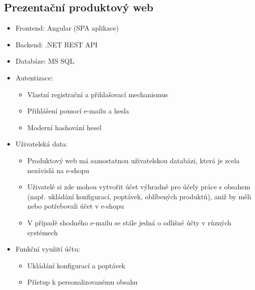 \documentclass[a4paper,12pt]{article}
\begin{document}
\subsection{Prezentační produktový web}

\begin{itemize}

\item Frontend: Angular (SPA aplikace)

\item Backend: .NET REST API

\item Databáze: MS SQL

\item Autentizace:\begin{itemize}

\item Vlastní registrační a přihlašovací mechanismus

\item Přihlášení pomocí e-mailu a hesla

\item Moderní hashování hesel

\end{itemize}



\item Uživatelská data:\begin{itemize}

\item Produktový web má samostatnou uživatelskou databázi, která je zcela nezávislá na e-shopu

\item Uživatelé si zde mohou vytvořit účet výhradně pro účely práce s obsahem (např. ukládání konfigurací, poptávek, oblíbených produktů), aniž by měli nebo potřebovali účet v e-shopu

\item V případě shodného e-mailu se stále jedná o odlišné účty v různých systémech

\end{itemize}



\item Funkční využití účtu:\begin{itemize}

\item Ukládání konfigurací a poptávek

\item Přístup k personalizovanému obsahu

\end{itemize}



\end{itemize}
\end{document}
